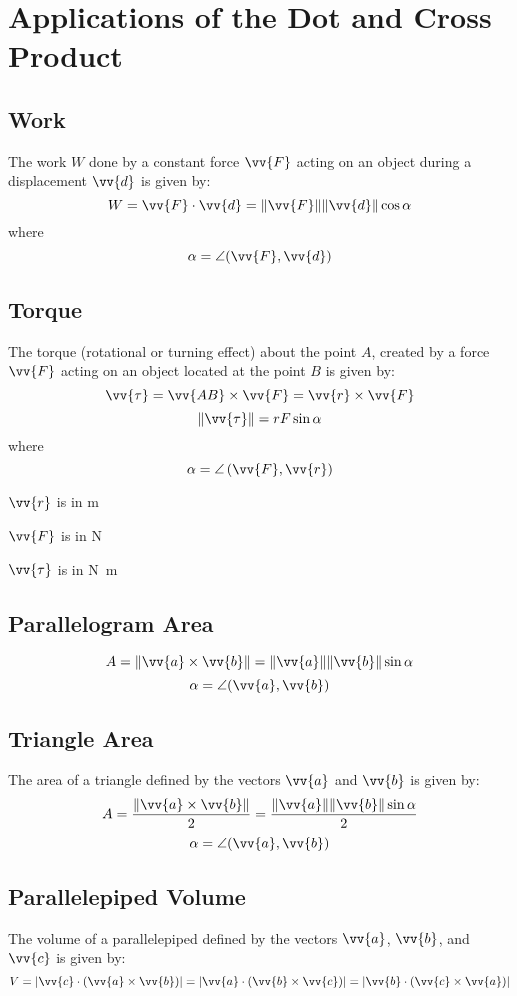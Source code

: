 	\section{Applications of the Dot and Cross Product}
		\subsection{Work}
			The work $W$ done by a constant force $\vv{F}$ acting on an object during a displacement $\vv{d}$ is given by:
			\[W = \vv{F} \cdot \vv{d} = \|\vv{F}\|\|\vv{d}\|\cos \alpha\]
			where
			\[\alpha = \angle (\vv{F}, \vv{d})\]
		\subsection{Torque}
			The torque (rotational or turning effect) about the point $A$, created by a force $\vv{F}$ acting on an object located at the point $B$ is given by:
			\[\vv{\tau} = \vv{AB} \times \vv{F} = \vv{r} \times \vv{F}\]
			\[\|\vv{\tau}\| = rF\sin\alpha\]
			where
			\[\alpha = \angle\left(\vv{F}, \vv{r}\right)\]

			$\vv{r}$ is in \si{\metre}

			$\vv{F}$ is in \si{\newton}
			
			$\vv{\tau}$ is in \si{\newton\metre}
		\subsection{Parallelogram Area}
			\[A = \|\vv{a} \times \vv{b}\| = \|\vv{a}\|\|\vv{b}\|\sin\alpha\]
			\[\alpha = \angle(\vv{a}, \vv{b})\]
		\subsection{Triangle Area}
			The area of a triangle defined by the vectors $\vv{a}$ and $\vv{b}$ is given by:
			\[A = \frac{\|\vv{a} \times \vv{b}\|}{2} = \frac{\|\vv{a}\|\|\vv{b}\|\sin\alpha}{2}\]
			\[\alpha = \angle(\vv{a}, \vv{b})\]
		\subsection{Parallelepiped Volume}
			The volume of a parallelepiped defined by the vectors $\vv{a}$, $\vv{b}$, and $\vv{c}$ is given by:
			\[V = |\vv{c} \cdot (\vv{a} \times \vv{b})| = |\vv{a} \cdot (\vv{b} \times \vv{c})| = |\vv{b} \cdot (\vv{c} \times \vv{a})|\]
